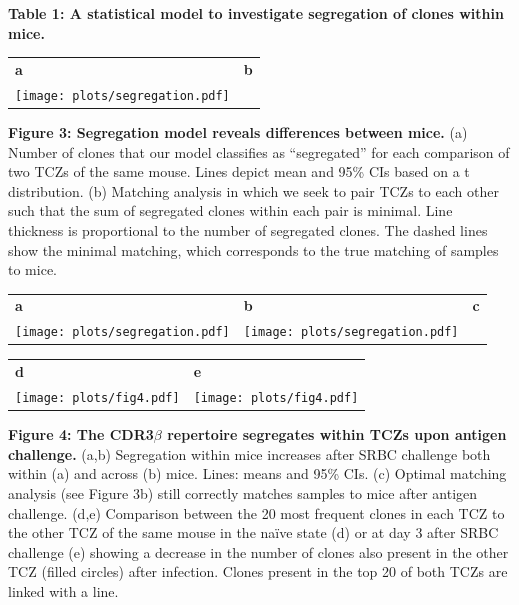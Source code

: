 \documentclass[a4paper]{article}
\newcommand{\s}[1]{{\bfseries\Large #1}}
\newcommand{\im}[1]{
\begin{tikzpicture}[xscale=2.3,yscale=2.3]

\foreach \a in {1,2,...,6}{
\node (x\a) [circle, fill=black, inner sep=2pt, outer sep=2pt] at (360-\a*360/6: 1cm) {};%
}

\draw [line width=0pt] (x1) -- node [midway, below=5mm] {mouse 1} (x2);
\draw [line width=0pt] (x3) -- node [midway, above=5mm,sloped] {mouse 2} (x4);
\draw [line width=0pt] (x5) -- node [midway, above=5mm,sloped] {mouse 3} (x6);

#1

\end{tikzpicture}
}
\begin{document}
{\bfseries Table 1: A statistical model to investigate segregation of clones within mice.}

\newpage

\begin{tabular}{ll}
\s{a} & \s{b}  \\ 

	{\texttt{[image: plots/segregation.pdf]}}
 & 
\raisebox{0.08cm}{\im{}}

\end{tabular}

{\bfseries Figure 3: Segregation model reveals differences between mice.} (a) Number of clones that our model classifies as “segregated” for each comparison of two TCZs of the same mouse. Lines depict mean and 95\% CIs based on a t distribution. (b) Matching analysis in which we seek to pair TCZs to each other such that the sum of segregated clones within each pair is minimal. Line thickness is proportional to the number of segregated clones. The dashed lines show the minimal matching, which corresponds to the true matching of samples to mice.

\newpage

\begin{tabular}{lll}
\s{a} & \s{b} & \s{c} \\ 
\texttt{[image: plots/segregation.pdf]} &
\texttt{[image: plots/segregation.pdf]} &
\raisebox{0.08cm}{\im{}}
\end{tabular}

\begin{tabular}{ll}
\s{d} & \s{e} \\
\texttt{[image: plots/fig4.pdf]} & 
\texttt{[image: plots/fig4.pdf]}
\end{tabular}

{\bfseries Figure 4: The CDR3$\beta$ repertoire segregates within TCZs upon antigen challenge.} (a,b) Segregation within mice increases after SRBC challenge both within (a) and across (b) mice. Lines: means and 95\% CIs. (c) Optimal matching analysis (see Figure 3b) still correctly matches samples to mice after antigen challenge. (d,e) Comparison between the 20 most frequent clones in each TCZ to the other TCZ of the same mouse in the naïve state (d) or at day 3 after SRBC challenge (e) showing a decrease in the number of clones also present in the other TCZ (filled circles) after infection. Clones present in the top 20 of both TCZs are linked with a line.

\newpage
\end{document}

